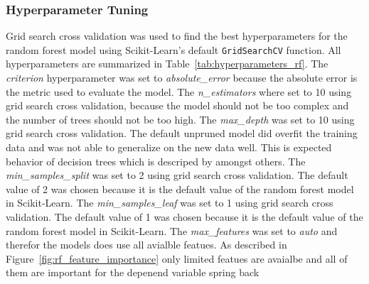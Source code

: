 \subsubsection*{Hyperparameter Tuning}
Grid search cross validation was used to find the best hyperparameters for the random forest model using Scikit-Learn's default \texttt{GridSearchCV} function. 
All hyperparameters are summarized in Table~\ref{tab:hyperparameters_rf}. 
The \textit{criterion} hyperparameter was set to \textit{absolute\_error} because the absolute error is the metric used to evaluate the model.
The \textit{n\_estimators} where set to 10 using grid search cross validation, because the model should not be too complex and the number of trees should not be too high. 
The \textit{max\_depth} was set to 10 using grid search cross validation. The default unpruned model did overfit the training data and was not able to generalize on the new data well. This is expected behavior of decision trees which is descriped by \cite[p. 133-136]{muller_introductionmachinelearning_2016} amongst others. 
The \textit{min\_samples\_split} was set to 2 using grid search cross validation. The default value of 2 was chosen because it is the default value of the random forest model in Scikit-Learn.
The \textit{min\_samples\_leaf} was set to 1 using grid search cross validation. The default value of 1 was chosen because it is the default value of the random forest model in Scikit-Learn.
The \textit{max\_features} was set to \textit{auto} and therefor the models does use all avialble featues. As described in Figure~\ref{fig:rf_feature_importance} only limited featues are avaialbe and all of them are important for the depenend variable spring back

